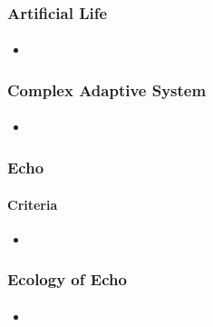 \frame
{
	\frametitle{Artificial Life}
	\framesubtitle{}

	\begin{itemize}
		\item 
	\end{itemize}
}

\frame
{
	\frametitle{Complex Adaptive System}
	\framesubtitle{}

	\begin{itemize}
		\item 
	\end{itemize}
}

\frame
{
	\frametitle{Echo}
	\framesubtitle{Criteria}

	\begin{itemize}
		\item 
	\end{itemize}
}

\frame
{
	\frametitle{Ecology of Echo}
	\framesubtitle{}

	\begin{itemize}
		\item 
	\end{itemize}
}
